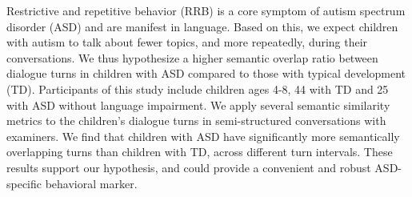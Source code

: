 Restrictive and repetitive behavior (RRB) is a core symptom of autism spectrum disorder (ASD) and are manifest in language. Based on this, we expect children with autism to talk about fewer topics, and more repeatedly, during their conversations. We thus hypothesize a higher semantic overlap ratio between dialogue turns in children with ASD compared to those with typical development (TD). Participants of this study include children ages 4-8, 44 with TD and 25 with ASD without language impairment. We apply several semantic similarity metrics to the children's dialogue turns in semi-structured conversations with examiners. We find that children with ASD have significantly more semantically overlapping turns than children with TD, across different turn intervals. These results support our hypothesis, and could provide a convenient and robust ASD-specific behavioral marker.
